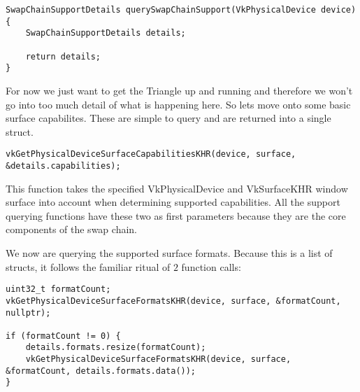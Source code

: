 \begin{center}
\begin{minipage}{0.95\linewidth}
\begin{lstlisting}
SwapChainSupportDetails querySwapChainSupport(VkPhysicalDevice device) {
    SwapChainSupportDetails details;

    return details;
}
\end{lstlisting}
\end{minipage}
\end{center}

\par For now we just want to get the Triangle up and running and therefore we won't go into too much detail of what is happening here. So lets move onto some basic surface capabilites. These are simple to query and are returned into a single  struct.

\begin{center}
\begin{minipage}{0.95\linewidth}
\begin{lstlisting}
vkGetPhysicalDeviceSurfaceCapabilitiesKHR(device, surface, &details.capabilities);
\end{lstlisting}
\end{minipage}
\end{center}

\par This function takes the specified VkPhysicalDevice and VkSurfaceKHR window surface into account when determining supported capabilities. All the support querying functions have these two as first parameters because they are the core components of the swap chain.

\par We now are querying the supported surface formats. Because this is a list of structs, it follows the familiar ritual of $2$ function calls:

\begin{center}
\begin{minipage}{0.95\linewidth}
\begin{lstlisting}
uint32_t formatCount;
vkGetPhysicalDeviceSurfaceFormatsKHR(device, surface, &formatCount, nullptr);

if (formatCount != 0) {
    details.formats.resize(formatCount);
    vkGetPhysicalDeviceSurfaceFormatsKHR(device, surface, &formatCount, details.formats.data());
}
\end{lstlisting}
\end{minipage}
\end{center}

